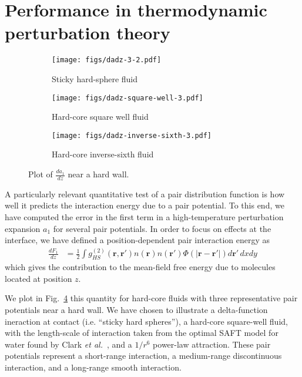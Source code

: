 \documentclass[letterpaper,twocolumn,amsmath,amssymb,pre,aps,10pt]{revtex4-1}
\newcommand{\rr}{\textbf{r}}
\begin{document}
\section{Performance in thermodynamic perturbation theory}

\begin{figure}
  \begin{subfigure}{\columnwidth}
    \texttt{[image: figs/dadz-3-2.pdf]}
    \vspace{-0.8cm}
    \caption{Sticky hard-sphere fluid}\label{fig:dadz-delta}
  \end{subfigure}
  \begin{subfigure}{\columnwidth}
    \texttt{[image: figs/dadz-square-well-3.pdf]}
    \vspace{-0.8cm}
    \caption{Hard-core square well fluid}\label{fig:dadz-square-well}
  \end{subfigure}
  \begin{subfigure}{\columnwidth}
    \texttt{[image: figs/dadz-inverse-sixth-3.pdf]}
    \vspace{-0.8cm}
    \caption{Hard-core inverse-sixth fluid}\label{fig:dadz-inverse-sixth}
  \end{subfigure}
  \caption{Plot of $\frac{da_1}{dz}$ near a hard
    wall.}\label{fig:dadz}
\end{figure}

A particularly relevant quantitative test of a pair distribution
function is how well it predicts the interaction energy due to a pair
potential.  To this end, we have computed the error in the first term
in a high-temperature perturbation expansion $a_1$ for several pair
potentials.  In order to focus on effects at the interface, we have
defined a position-dependent pair interaction energy as
\begin{align}
  \frac{dF_1}{dz} &=
  \tfrac12 \int g^{(2)}_{HS}(\rr,\rr')n(\rr)n(\rr')\Phi(|\rr-\rr'|)
  d\rr'\, dxdy\label{eq:da1}
\end{align}
which gives the contribution to the mean-field free energy due to
molecules located at position $z$.

We plot in Fig.~\ref{fig:dadz} this quantity for hard-core fluids with
three representative pair potentials near a hard wall.  We have chosen
to illustrate a delta-function ineraction at contact (i.e. ``sticky
hard spheres''), a hard-core square-well fluid, with the length-scale
of interaction taken from the optimal SAFT model for water found by
Clark \emph{et al.}~\cite{clark2006developing}, and a $1/r^6$
power-law attraction.  These pair potentials represent a short-range
interaction, a medium-range discontinuous interaction, and a
long-range smooth interaction.
\end{document}

